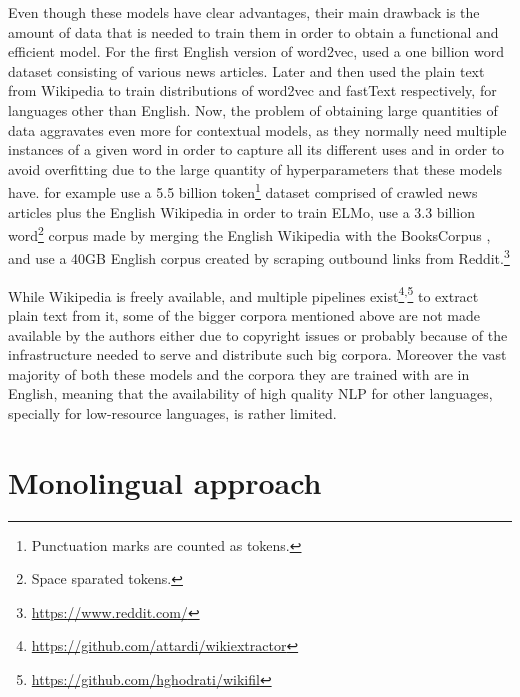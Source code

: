 Even though these models have clear advantages, their main drawback is the amount of data that is needed to train them in order to obtain a functional and efficient model. For the first English version of word2vec, \citet{mikolov-etal-2013-distributed} used a one billion word dataset consisting of various news articles. Later \citet{al-rfou-etal-2013-polyglot} and then \citet{bojanowski-etal-2017-enriching} used the plain text from Wikipedia to train distributions of word2vec and fastText respectively, for languages other than English. Now, the problem of obtaining large quantities of data aggravates even more for contextual models, as they normally need multiple instances of a given word in order to capture all its different uses and in order to avoid overfitting due to the large quantity of hyperparameters that these models have. \citet{peters-etal-2018-deep} for example use a 5.5 billion token\footnote{Punctuation marks are counted as tokens.} dataset comprised of crawled news articles plus the English Wikipedia in order to train ELMo, \citet{devlin-etal-2019-bert} use a 3.3 billion word\footnote{Space sparated tokens.} corpus made by merging the English Wikipedia with the BooksCorpus \citep{zhu-etal-2015-aligning}, and \citet{radford-etal-2019-language} use a 40GB English corpus created by scraping outbound links from Reddit.\footnote{\url{https://www.reddit.com/}}

While Wikipedia is freely available, and multiple pipelines exist\footnote{\url{https://github.com/attardi/wikiextractor}}\textsuperscript{,}\footnote{\url{https://github.com/hghodrati/wikifil}} to extract plain text from it, some of the bigger corpora mentioned above are not made available by the authors either due to copyright issues or probably because of the infrastructure needed to serve and distribute such big corpora. Moreover the vast majority of both these models and the corpora they are trained with are in English, meaning that the availability of high quality NLP for other languages, specially for low-resource languages, is rather limited.

\section{Monolingual approach}

